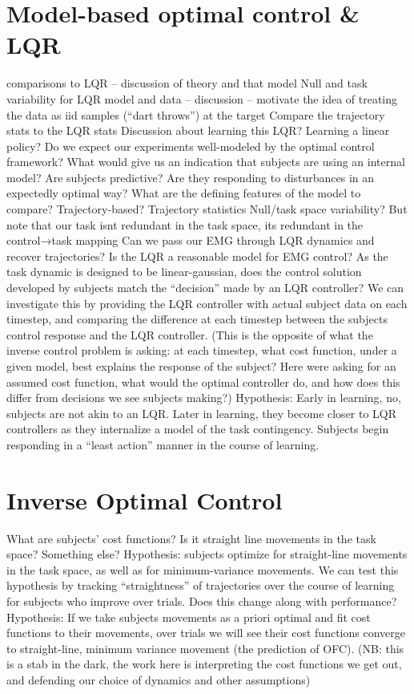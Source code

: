 \documentclass[../main.tex]{subfiles}
\begin{document}
\section{Model-based optimal control \& LQR}

comparisons to LQR – discussion of theory and that model
Null and task variability for LQR model and data – discussion – motivate the idea of treating the data as iid samples (“dart throws”) at the target
Compare the trajectory stats to the LQR stats
Discussion about learning this LQR? Learning a linear policy?
Do we expect our experiments well-modeled by the optimal control framework?
What would give us an indication that subjects are using an internal model? 
Are subjects predictive?
Are they responding to disturbances in an expectedly optimal way?
What are the defining features of the model to compare?
Trajectory-based? Trajectory statistics
Null/task space variability? But note that our task isnt redundant in the task space, its redundant in the control→task mapping
Can we pass our EMG through LQR dynamics and recover trajectories?
Is the LQR a reasonable model for EMG control? As the task dynamic is designed to be linear-gaussian, does the control solution developed by subjects match the “decision” made by an LQR controller? We can investigate this by providing the LQR controller with actual subject data on each timestep, and comparing the difference at each timestep between the subjects control response and the LQR controller. (This is the opposite of what the inverse control problem is asking: at each timestep, what cost function, under a given model, best explains the response of the subject? Here were asking for an assumed cost function, what would the optimal controller do, and how does this differ from decisions we see subjects making?)
Hypothesis: Early in learning, no, subjects are not akin to an LQR. Later in learning, they become closer to LQR controllers as they internalize a model of the task contingency. Subjects begin responding in a “least action” manner in the course of learning.

\section{Inverse Optimal Control}
What are subjects' cost functions? Is it straight line movements in the task space? Something else?
Hypothesis: subjects optimize for straight-line movements in the task space, as well as for minimum-variance movements. We can test this hypothesis by tracking “straightness” of trajectories over the course of learning for subjects who improve over trials. Does this change along with performance? 
Hypothesis: If we take subjects movements as a priori optimal and fit cost functions to their movements, over trials we will see their cost functions converge to straight-line, minimum variance movement (the prediction of OFC). (NB: this is a stab in the dark, the work here is interpreting the cost functions we get out, and defending our choice of dynamics and other assumptions)



\end{document}
